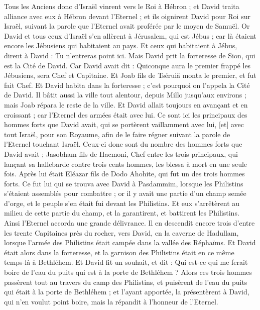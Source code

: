 \begin{multicols}{2}
Tous les Anciens donc d'Israël vinrent vers le Roi à Hébron ; et David traita alliance avec eux à Hébron devant l'Eternel ; et ils oignirent David pour Roi sur Israël, suivant la parole que l'Eternel avait proférée par le moyen de Samuël.
Or David et tous ceux d'Israël s'en allèrent à Jérusalem, qui est Jébus ; car là étaient encore les Jébusiens qui habitaient au pays.
Et ceux qui habitaient à Jébus, dirent à David : Tu n'entreras point ici. Mais David prit la forteresse de Sion, qui est la Cité de David.
Car David avait dit : Quiconque aura le premier frappé les Jébusiens, sera Chef et Capitaine. Et Joab fils de Tséruiä monta le premier, et fut fait Chef.
Et David habita dans la forteresse ; c'est pourquoi on l'appela la Cité de David.
Il bâtit aussi la ville tout alentour, depuis Millo jusqu'aux environs ; mais Joab répara le reste de la ville.
Et David allait toujours en avançant et en croissant ; car l'Eternel des armées était avec lui.
Ce sont ici les principaux des hommes forts que David avait, qui se portèrent vaillamment avec lui, [et] avec tout Israël, pour son Royaume, afin de le faire régner suivant la parole de l'Eternel touchant Israël.
Ceux-ci donc sont du nombre des hommes forts que David avait ; Jasobham fils de Hacmoni, Chef entre les trois principaux, qui lançant sa hallebarde contre trois cents hommes, les blessa à mort en une seule fois.
Après lui était Eléazar fils de Dodo Ahohite, qui fut un des trois hommes forts.
Ce fut lui qui se trouva avec David à Pasdammim, lorsque les Philistins s'étaient assemblés pour combattre ; or il y avait une partie d'un champ semée d'orge, et le peuple s'en était fui devant les Philistins.
Et eux s'arrêtèrent au milieu de cette partie du champ, et la garantirent, et battirent les Philistins. Ainsi l'Eternel accorda une grande délivrance.
Il en descendit encore trois d'entre les trente Capitaines près du rocher, vers David, en la caverne de Hadullam, lorsque l'armée des Philistins était campée dans la vallée des Réphaïms.
Et David était alors dans la forteresse, et la garnison des Philistins était en ce même temps-là à Bethléhem.
Et David fit un souhait, et dit : Qui est-ce qui me ferait boire de l'eau du puits qui est à la porte de Bethléhem ?
Alors ces trois hommes passèrent tout au travers du camp des Philistins, et puisèrent de l'eau du puits qui était à la porte de Bethléhem ; et l'ayant apportée, la présentèrent à David, qui n'en voulut point boire, mais la répandit à l'honneur de l'Eternel.

\end{multicols}
